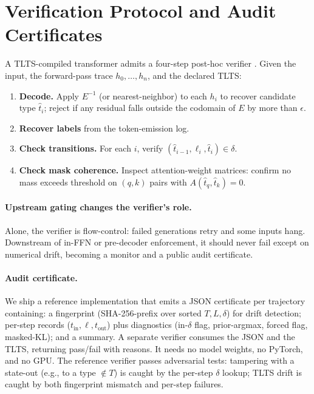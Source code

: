 \documentclass[preprint]{nesy2026}
\begin{document}
\section{Verification Protocol and Audit Certificates}
\label{sec:verif}

A TLTS-compiled transformer admits a four-step post-hoc verifier
\citep{constrained_decoding}. Given the input, the forward-pass
trace $h_0, \ldots, h_n$, and the declared TLTS:

\begin{enumerate}
\item \textbf{Decode.} Apply $E^{-1}$ (or nearest-neighbor) to each
  $h_i$ to recover candidate type $\hat{t}_i$; reject if any
  residual falls outside the codomain of $E$ by more than
  $\epsilon$.
\item \textbf{Recover labels} from the token-emission log.
\item \textbf{Check transitions.} For each $i$, verify
  $(\hat{t}_{i-1}, \ell_i, \hat{t}_i) \in \delta$.
\item \textbf{Check mask coherence.} Inspect attention-weight
  matrices: confirm no mass exceeds threshold on $(q,k)$ pairs with
  $A(\hat{t}_q, \hat{t}_k) = 0$.
\end{enumerate}

\paragraph{Upstream gating changes the verifier's role.} Alone, the
verifier is flow-control: failed generations retry and some inputs
hang. Downstream of in-FFN or pre-decoder enforcement, it should
never fail except on numerical drift, becoming a monitor and a
public audit certificate.

\paragraph{Audit certificate.} We ship a reference implementation
that emits a JSON certificate per trajectory containing: a
fingerprint (SHA-256-prefix over sorted $T, L, \delta$) for drift
detection; per-step records ($t_{\text{in}}, \ell, t_{\text{out}}$)
plus diagnostics (in-$\delta$ flag, prior-argmax, forced flag,
masked-KL); and a summary. A separate verifier consumes the JSON
and the TLTS, returning pass/fail with reasons. It needs no model
weights, no PyTorch, and no GPU. The reference verifier passes
adversarial tests: tampering with a state-out (e.g., to a type
$\notin T$) is caught by the per-step $\delta$ lookup; TLTS drift is
caught by both fingerprint mismatch and per-step failures.
\end{document}
